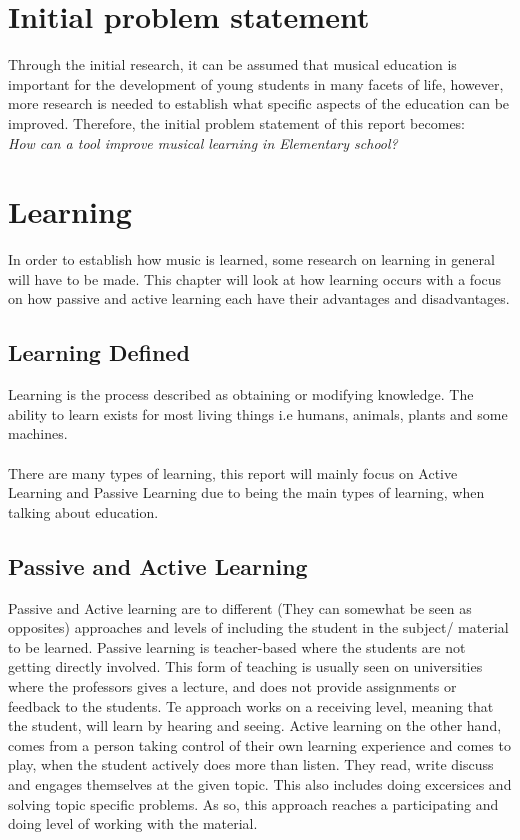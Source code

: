 \section{Initial problem statement}
Through the initial research, it can be assumed that musical education is important for the development of young students in many facets of life, however, more research is needed to establish what specific aspects of the education can be improved. Therefore, the initial problem statement of this report becomes:\\ 

\textit{How can a tool improve musical learning in Elementary school?}

\section{Learning}

In order to establish how music is learned, some research on learning in general will have to be made. This chapter will look at how learning occurs with a focus on how passive and active learning each have their advantages and disadvantages.

\subsection{Learning Defined}\label{sec:learning}
Learning is the process described as obtaining or modifying knowledge. The ability to learn exists for most living things i.e humans, animals, plants and some machines. \\
\\
There are many types of learning, this report will mainly focus on Active Learning and Passive Learning due to being the main types of learning, when talking about education.

\subsection*{Passive and Active Learning}\label{sec:activeLearning}
Passive and Active learning are to different (They can somewhat be seen as opposites) approaches and levels of including the student in the subject/ material to be learned. 
Passive learning is teacher-based where the students are not getting directly involved. This form of teaching is usually seen on universities where the professors gives a lecture, and does not provide assignments or feedback to the students. Te approach works on a receiving level, meaning that the student, will learn by hearing and seeing.  
Active learning on the other hand, comes from a person taking control of their own learning experience and comes to play, when the student actively does more than listen. They read, write discuss and engages themselves at the given topic. This also includes doing excersices and solving topic specific problems\cite{activelearning}. As so, this approach reaches a participating and doing level of working with the material. 

